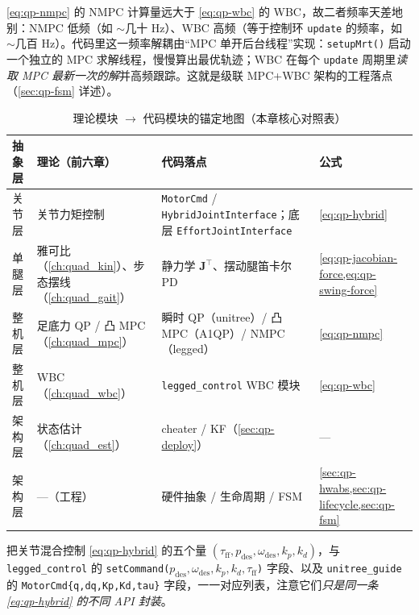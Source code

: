 \begin{insight}\label{ins:qp-freq-decouple}
\cref{eq:qp-nmpc} 的 NMPC 计算量远大于 \cref{eq:qp-wbc} 的 WBC，故二者频率天差地别：NMPC 低频（如 $\sim$几十 Hz）、WBC 高频（等于控制环 \texttt{update} 的频率，如 $\sim$几百 Hz）。代码里这一频率解耦由“MPC 单开后台线程”实现：\texttt{setupMrt()} 启动一个独立的 MPC 求解线程，慢慢算出最优轨迹；WBC 在每个 \texttt{update} 周期里\emph{读取 MPC 最新一次的解}并高频跟踪。这就是级联 MPC+WBC 架构的工程落点（\cref{sec:qp-fsm} 详述）。
\end{insight}

\begin{table}[H]\centering\small
\caption{理论模块 $\to$ 代码模块的锚定地图（本章核心对照表）}
\begin{tabular}{p{} p{} p{} p{}}
\toprule
抽象层 & 理论（前六章）& 代码落点 & 公式 \\
\midrule
关节层 & 关节力矩控制 & \texttt{MotorCmd} / \texttt{HybridJointInterface}；底层 \texttt{EffortJointInterface} & \cref{eq:qp-hybrid} \\
单腿层 & 雅可比（\cref{ch:quad_kin}）、步态摆线（\cref{ch:quad_gait}）& 静力学 $\mathbf{J}^\top$、摆动腿笛卡尔 PD & \cref{eq:qp-jacobian-force,eq:qp-swing-force} \\
整机层 & 足底力 QP / 凸 MPC（\cref{ch:quad_mpc}）& 瞬时 QP（unitree）/ 凸 MPC（A1QP）/ NMPC（legged）& \cref{eq:qp-nmpc} \\
整机层 & WBC（\cref{ch:quad_wbc}）& \texttt{legged\_control} WBC 模块 & \cref{eq:qp-wbc} \\
架构层 & 状态估计（\cref{ch:quad_est}）& cheater / KF（\cref{sec:qp-deploy}）& --- \\
架构层 & ---（工程）& 硬件抽象 / 生命周期 / FSM & \cref{sec:qp-hwabs,sec:qp-lifecycle,sec:qp-fsm} \\
\bottomrule
\end{tabular}
\label{tab:qp-anchor}
\end{table}

\begin{practice}
把关节混合控制 \cref{eq:qp-hybrid} 的五个量 $(\tau_{\mathrm{ff}},p_{\mathrm{des}},\omega_{\mathrm{des}},k_p,k_d)$，与 \texttt{legged\_control} 的 \texttt{setCommand($p_{\mathrm{des}},\omega_{\mathrm{des}},k_p,k_d,\tau_{\mathrm{ff}}$)} 字段、以及 \texttt{unitree\_guide} 的 \texttt{MotorCmd\{q,dq,Kp,Kd,tau\}} 字段，一一对应列表，注意它们\emph{只是同一条 \cref{eq:qp-hybrid} 的不同 API 封装}。
\end{practice}

